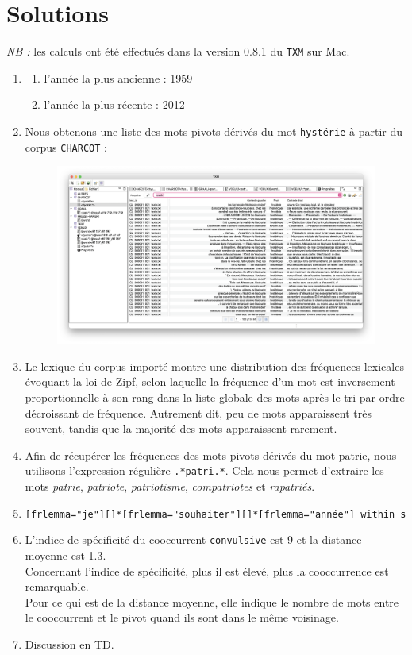 \documentclass[xcolor={table,usenames,dvipsnames}]{article}
\begin{document}
\section{Solutions}
\textit{NB :} les calculs ont été effectués dans la version \textsc{0.8.1} du \texttt{TXM} sur Mac.
\begin{enumerate}
	\item
	\begin{enumerate}
		\item l'année la plus ancienne : 1959 
		\item l'année la plus récente : 2012
 	\end{enumerate}
 	
 	\item Nous obtenons une liste des mots-pivots dérivés du mot \texttt{hystérie} à partir du corpus \texttt{CHARCOT} :
 	\begin{figure}[h] %
 		\centering
 		\includegraphics[width=0.80\linewidth]{img/hysterie.png}
 		\label{fig:ling_out_TAL}
 	\end{figure}
 	
 	\item Le lexique du corpus importé montre une distribution des fréquences lexicales évoquant la loi de Zipf, selon laquelle la fréquence d'un mot est inversement proportionnelle à son rang dans la liste globale des mots après le tri par ordre décroissant de fréquence. Autrement dit, peu de mots apparaissent très souvent, tandis que la majorité des mots apparaissent rarement.
 	
 	\item Afin de récupérer les fréquences des mots-pivots dérivés du mot \og{}patrie\fg{}, nous utilisons l'expression régulière \texttt{.*patri.*}. Cela nous permet d'extraire les mots \textit{patrie}, \textit{patriote}, \textit{patriotisme}, \textit{compatriotes} et \textit{rapatriés}.
 	
 	\item \texttt{[frlemma="je"][]*[frlemma="souhaiter"][]*[frlemma="année"] within s}
 	\item L'indice de spécificité du cooccurrent \texttt{convulsive} est \textsc{9} et la distance moyenne est \textsc{1.3}.\\ Concernant l'indice de spécificité, plus il est élevé, plus
 	la cooccurrence est remarquable. \\
 	Pour ce qui est de la distance moyenne, elle indique le nombre de mots entre le cooccurrent et le pivot quand ils sont dans le même voisinage.
 	\item Discussion en \textsc{TD}.
 	
\end{enumerate}



		\printbibliography

	
\end{document}
